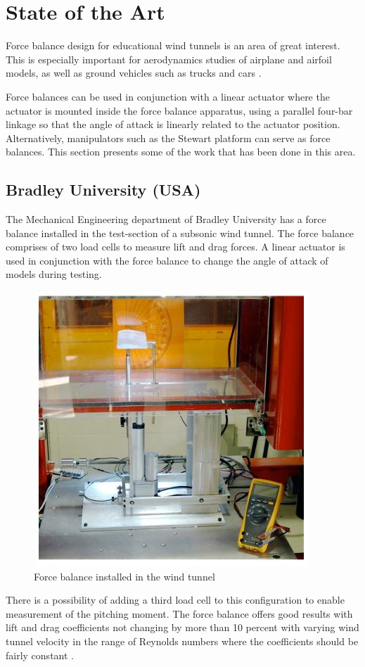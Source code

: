 \section{State of the Art}
Force balance design for educational wind tunnels is an area of great interest. This is especially important
for aerodynamics studies of airplane and airfoil models, as well as ground vehicles such as trucks
and cars \cite{morris_force_2010}.

Force balances can be used in conjunction with a linear actuator where the
actuator is mounted inside the force balance apparatus, using a parallel four-bar linkage so that
the angle of attack is linearly related to the actuator position. Alternatively, manipulators such as the Stewart platform can serve as force balances. This section presents some of the work that has been done in this area.
\subsection{Bradley University (USA)}
The Mechanical Engineering department of Bradley University has a force balance installed in the test-section of a subsonic wind tunnel. The force balance comprises of two load cells to measure lift and drag forces. A linear actuator is used in conjunction with the force balance to change the angle of attack of models during testing.
\begin{center}
	\begin{figure}[H]
	\centering
	\includegraphics[width=0.6\linewidth]{Figures/force}
	\caption[Force balance installed]{Force balance installed in the wind tunnel \cite{morris_force_2010}}
	\end{figure}
\end{center}
There is a possibility of adding a third load cell to this configuration to enable measurement of the pitching moment. The force balance offers good results with lift and drag coefficients not changing by more than 10 percent with varying wind tunnel velocity in the range of Reynolds
numbers where the coefficients should be fairly constant \cite{morris_force_2010}.

